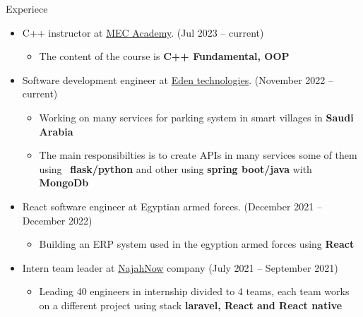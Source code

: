 \documentclass{resume}
\begin{document}
\begin{rSection}{Experiece}
  \begin{itemize}
    \item C++ instructor at \href{https://web.facebook.com/mecacademyegy}{MEC Academy}. \hfill{(Jul 2023 – current)}
          \begin{itemize}
            \item The content of the course is \textbf{C++ Fundamental, OOP}
          \end{itemize}
    
    \item Software development engineer at \href{https://www.linkedin.com/company/edentech2/mycompany/}{Eden technologies}. \hfill{(November 2022 – current)}
          \begin{itemize}
            \item Working on many services for parking system in smart villages in \textbf{Saudi Arabia}
            \item The main responsibilties is to create APIs in many services some of them using \
              \textbf{flask/python} and other using \textbf{spring boot/java} with \textbf{MongoDb}
          \end{itemize}
    \item React software engineer at Egyptian armed forces. \hfill{(December 2021 – December 2022)}
    \begin{itemize}
      \item Building an ERP system used in the egyption armed forces using \textbf{React}
    \end{itemize}
    \item Intern team leader at \href{https://najahnow.net}{NajahNow} company \hfill{(July 2021 – September 2021)}
          \begin{itemize}
            \item Leading 40 engineers in internship divided to 4 teams, 
            each team works on a different project using stack \textbf{laravel, React and React native}
          \end{itemize}


\end{itemize}
\end{rSection}
\end{document}

